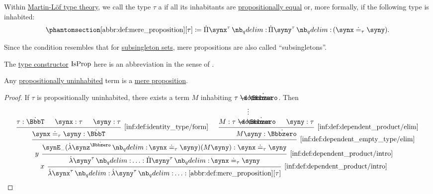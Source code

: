 \begin{definition}\label{def:mere_proposition}
  Within \hyperref[def:mltt]{Martin-L\"of type theory}, we call the type \( \tau \) a  if all its inhabitants are \hyperref[def:mltt_propositional_equality]{propositionally equal} or, more formally, if the following type is inhabited:
  \begin{equation*}\taglabel[\op{IsProp}]{abbr:def:mere_proposition}
    \ref{abbr:def:mere_proposition}[\tau] \coloneqq \qprod {\synx^\tau} \qprod {\syny^\tau} (\synx \syneq_\tau \syny).
  \end{equation*}
\end{definition}
\begin{comments}
  \item Since the condition resembles that for \hyperref[def:subsingleton_set]{subsingleton sets}, mere propositions are also called \enquote{subsingletons}.

  \item The \hyperref[con:type_constructor]{type constructor} \( \op{IsProp} \) here is an abbreviation in the sense of .
\end{comments}

\begin{proposition}\label{thm:uninhabited_type_is_proposition}
  Any \hyperref[def:propositionally_uninhabited]{propositionally uninhabited} term is a \hyperref[def:mere_proposition]{mere proposition}.
\end{proposition}
\begin{proof}
  If \( \tau \) is propositionally uninhabited, there exists a term \( M \) inhabiting \( \tau \synimplies \syn\Bbbzero \). Then
  \begin{equation*}
    \begin{prooftree}
      \hypo{ \tau: \syn\BbbT }
      \hypo{ \synx: \tau }
      \hypo{ \syny: \tau }
      \infer3[\ref{inf:def:identity_type/form}]{ \synx \syneq_\tau \syny: \syn\BbbT }

      \hypo {}
      \ellipsis {} { M: \tau \synimplies \syn\Bbbzero }

      \hypo{ \syny: \tau }
      \infer2[\ref{inf:def:dependent_product/elim}]{ M \syny: \syn\Bbbzero }

      \infer2[\ref{inf:def:dependent_empty_type/elim}]{ \synE_- (\qabs {\synz^{\syn\Bbbzero}} \synx \syneq_\tau \syny) (M \syny): \synx \syneq_\tau \syny }
      \infer[left label=\( y \)]1[\ref{inf:def:dependent_product/intro}]{ \qabs {\syny^\tau} \ldots: \qprod {\syny^\tau} \synx \syneq_\tau \syny }
      \infer[left label=\( x \)]1[\ref{inf:def:dependent_product/intro}]{ \qabs {\synx^\tau} \qabs {\syny^\tau} \ldots: \ref{abbr:def:mere_proposition}[\tau] }
    \end{prooftree}
  \end{equation*}
\end{proof}

